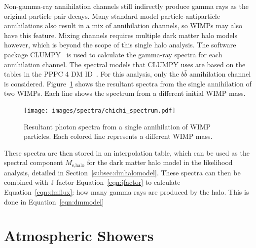     Non-gamma-ray annihilation channels still indirectly produce gamma rays as the original particle pair decays.
    Many standard model particle-antiparticle annihilations also result in a mix of annihilation channels, so WIMPs may also have this feature.
    Mixing channels requires multiple dark matter halo models however, which is beyond the scope of this single halo analysis.
    The software package CLUMPY~\cite{CLUMPYcode} is used to calculate the gamma-ray spectra for each annihilation channel.
    The spectral models that CLUMPY uses are based on the tables in the PPPC 4 DM ID~\cite{pppc4_dm_spectra}.
    For this analysis, only the $b\bar{b}$ annihilation channel is considered.
    Figure~\ref{fig:chichi_spectrum} shows the resultant spectra from the single annihilation of two WIMPs.
    Each line shows the spectrum from a different initial WIMP mass.

    \begin{figure}[ht]
      \centering
      \texttt{[image: images/spectra/chichi\_spectrum.pdf]}
      \caption[Single Annihilation Spectra]{
        Resultant photon spectra from a single annihilation of WIMP particles.
        Each colored line represents a different WIMP mass.}
      \label{fig:chichi_spectrum}
    \end{figure}

    These spectra are then stored in an interpolation table, which can be used as the spectral component $M_{\textrm{e,halo}}$ for the dark matter halo model in the likelihood analysis, detailed in Section~\ref{subsec:dmhalomodel}.
    These spectra can then be combined with J factor Equation~\ref{eqn:jfactor} to calculate Equation~\ref{eqn:dmflux}: how many gamma rays are produced by the halo.
    This is done in Equation~\ref{eqn:dmmodel}

    \FloatBarrier
    
    
\section{Atmospheric Showers}

